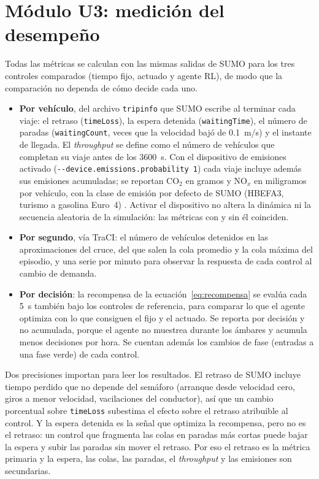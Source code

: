 \section{Módulo U3: medición del desempeño}
\label{sec:u3}

Todas las métricas se calculan con las mismas salidas de SUMO para los
tres controles comparados (tiempo fijo, actuado y agente RL), de modo
que la comparación no dependa de cómo decide cada uno.

\begin{itemize}
  \item \textbf{Por vehículo}, del archivo \texttt{tripinfo} que SUMO
    escribe al terminar cada viaje: el retraso (\texttt{timeLoss}), la
    espera detenida (\texttt{waitingTime}), el número de paradas
    (\texttt{waitingCount}, veces que la velocidad bajó de 0.1~m/s) y
    el instante de llegada. El \textit{throughput} se define como el
    número de vehículos que completan su viaje antes de los 3600~s. Con
    el dispositivo de emisiones activado
    (\verb|--device.emissions.probability 1|) cada viaje incluye además
    sus emisiones acumuladas; se reportan CO$_2$ en gramos y NO$_x$ en
    miligramos por vehículo, con la clase de emisión por defecto de SUMO
    (HBEFA3, turismo a gasolina Euro~4) \citep{SUMO_Emissions}. Activar
    el dispositivo no altera la dinámica ni la secuencia aleatoria de la
    simulación: las métricas con y sin él coinciden.
  \item \textbf{Por segundo}, vía TraCI: el número de vehículos
    detenidos en las aproximaciones del cruce, del que salen la cola
    promedio y la cola máxima del episodio, y una serie por minuto para
    observar la respuesta de cada control al cambio de demanda.
  \item \textbf{Por decisión}: la recompensa de la
    ecuación~\ref{eq:recompensa} se evalúa cada 5~s también bajo los
    controles de referencia, para comparar lo que el agente optimiza
    con lo que consiguen el fijo y el actuado. Se reporta por decisión y
    no acumulada, porque el agente no muestrea durante los ámbares y
    acumula menos decisiones por hora. Se cuentan además los cambios de
    fase (entradas a una fase verde) de cada control.
\end{itemize}

Dos precisiones importan para leer los resultados. El retraso de SUMO
incluye tiempo perdido que no depende del semáforo (arranque desde
velocidad cero, giros a menor velocidad, vacilaciones del conductor),
así que un cambio porcentual sobre \texttt{timeLoss} subestima el
efecto sobre el retraso atribuible al control. Y la espera detenida es
la señal que optimiza la recompensa, pero no es el retraso: un control
que fragmenta las colas en paradas más cortas puede bajar la espera y
subir las paradas sin mover el retraso. Por eso el retraso es la
métrica primaria y la espera, las colas, las paradas, el
\textit{throughput} y las emisiones son secundarias.

